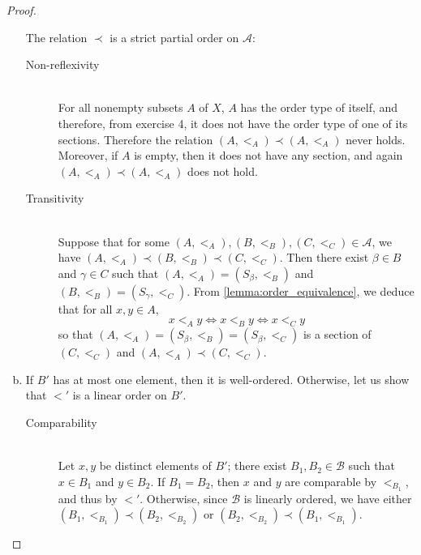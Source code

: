 \documentclass[11pt,a4paper,twoside]{article}
\theoremstyle{definition}
\theoremstyle{plain}
\begin{document}
\begin{proof}
\begin{enumerate}[(a)]
    The relation $\prec$ is a strict partial order on $\mathscr{A}$:

    \begin{description}

    \item [Non-reflexivity] \hspace{0pt}\\
      For all nonempty subsets $A$ of $X$, $A$ has the order type of itself, and therefore, from exercise 4,
      it does not have the order type of one of its sections. Therefore the relation $( A, <_A ) \prec ( A, <_A )$
      never holds. Moreover, if $A$ is empty, then it does not have any section, and again $( A, <_A ) \prec ( A, <_A )$
      does not hold.

    \item [Transitivity] \hspace{0pt}\\
      Suppose that for some $( A, <_A ), ( B, <_B ), ( C, <_C ) \in \mathscr{A}$, we have $( A, <_A ) \prec ( B, <_B ) \prec ( C, <_C )$.
      Then there exist $\beta \in B$ and $\gamma \in C$ such that $( A, <_A ) = ( S_\beta, <_B )$ and $( B, <_B ) = ( S_\gamma, <_C )$.
      From \cref{lemma:order_equivalence}, we deduce that for all $x, y \in A$,
      \begin{equation}\label{eq:increasing}
        x <_A y \iff x <_B y \iff x <_C y
      \end{equation}
      so that $( A, <_A ) = ( S_\beta, <_B ) = ( S_\beta, <_C )$ is a section of $( C, <_C )$ and $( A, <_A ) \prec ( C, <_C )$.

    \end{description}

  \item If $B'$ has at most one element, then it is well-ordered. Otherwise,
    let us show that $<'$ is a linear order on $B'$.
    \begin{description}

    \item [Comparability] \hspace{0pt}\\
      Let $x, y$ be distinct elements of $B'$; there exist $B_1, B_2 \in \mathscr{B}$
      such that $x \in B_1$ and $y \in B_2$. If $B_1 = B_2$, then $x$ and $y$ are
      comparable by $<_{B_1}$, and thus by $<'$. Otherwise,  since $\mathscr{B}$ is
      linearly ordered, we have either $( B_1, <_{B_1} ) \prec ( B_2, <_{B_2} )$ or
      $( B_2, <_{B_2} ) \prec ( B_1, <_{B_1} )$.


\end{description}
\end{enumerate}
\end{proof}
\end{document}
